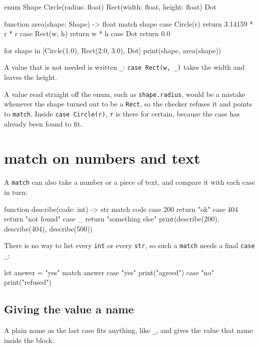 \begin{zeno}
enum Shape {
    Circle(radius: float)
    Rect(width: float, height: float)
    Dot
}

function area(shape: Shape) -> float {
    match shape {
        case Circle(r) { return 3.14159 * r * r }
        case Rect(w, h) { return w * h }
        case Dot { return 0.0 }
    }
}

for shape in [Circle(1.0), Rect(2.0, 3.0), Dot] {
    print(shape, area(shape))
}
\end{zeno}

A value that is not needed is written \verb|_|: \verb|case Rect(w, _)|
takes the width and leaves the height.

\begin{why}
A value read straight off the enum, such as \verb|shape.radius|,
would be a mistake whenever the shape turned out to be a
\verb|Rect|, so the checker refuses it and points to \verb|match|.
Inside \verb|case Circle(r)|, \verb|r| is there for certain, because
the case has already been found to fit.
\end{why}

\section{match on numbers and text}

A \verb|match| can also take a number or a piece of text, and compare
it with each case in turn:

\begin{zeno}
function describe(code: int) -> str {
    match code {
        case 200 { return "ok" }
        case 404 { return "not found" }
        case _ { return "something else" }
    }
}
print(describe(200), describe(404), describe(500))
\end{zeno}

There is no way to list every \verb|int| or every \verb|str|, so such a
\verb|match| needs a final \verb|case _|:

\begin{zeno}[fails=yes]
let answer = "yes"
match answer {
    case "yes" { print("agreed") }
    case "no" { print("refused") }
}
\end{zeno}

\subsection{Giving the value a name}

A plain name as the last case fits anything, like \verb|_|, and gives
the value that name inside the block:


